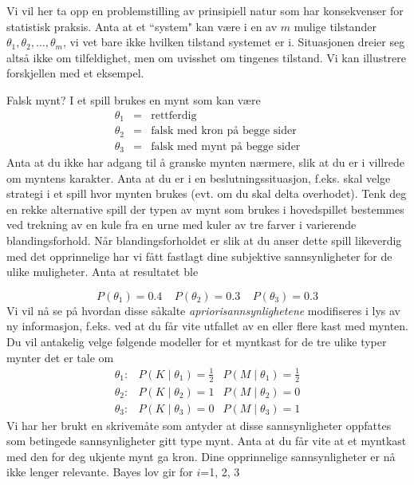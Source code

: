 {{Vi vil her ta opp en problemstilling av prinsipiell natur som har 
konsekvenser for statistisk praksis.  Anta at et ``system" kan være
i en av $m$ mulige tilstander ${\theta}_1, {\theta}_2, \ldots, {\theta}_m$,
vi vet bare ikke hvilken tilstand systemet er i.  Situasjonen dreier
seg altså ikke om tilfeldighet, men om uvisshet om tingenes tilstand.
Vi kan illustrere forskjellen med et eksempel.\\

\begin{eksempel}{Falsk mynt?}
I et spill brukes en mynt som kan være
\begin{eqnarray*}
  {\theta}_1 &=&\mbox{rettferdig} \\
  {\theta}_2 &=&\mbox{falsk med kron på begge sider} \\
  {\theta}_3 &=&\mbox{falsk med mynt på begge sider}
\end{eqnarray*}
Anta at du ikke har adgang til å granske mynten nærmere, slik
at du er i villrede om myntens karakter.  Anta at du er i en 
beslutningssituasjon, f.eks. skal velge strategi i et spill hvor
mynten brukes (evt. om du skal delta overhodet).  Tenk deg en rekke
alternative spill der typen av mynt som brukes i hovedspillet bestemmes
ved trekning av en kule fra en urne med kuler av tre farver i 
varierende blandingsforhold.  Når blandingsforholdet er slik at 
du anser dette spill likeverdig med det opprinnelige har vi fått
fastlagt dine subjektive sannsynligheter for de ulike muligheter.  Anta
at resultatet ble

\[ P({\theta}_1)=0.4 \;\;\;\; P({\theta}_2)=0.3 \;\;\;\; P({\theta}_3)=0.3  \]
Vi vil nå se på hvordan disse såkalte 
{\em apriorisannsynlighetene} modifiseres i lys av ny informasjon, f.eks.
ved at du får vite utfallet av en eller flere kast med mynten.  Du
vil antakelig velge følgende modeller for et myntkast for de tre
ulike typer mynter det er tale om 
$$
\begin{array}{rcc}
  {\theta}_1: & P(K\mid {\theta}_1)=\frac{1}{2} &
                         P(M\mid {\theta}_1)=\frac{1}{2} \\
 {\theta}_2: & P(K\mid {\theta}_2)=1            & P(M\mid {\theta}_2)=0  \\
  {\theta}_3: & P(K\mid {\theta}_3)=0           & P(M\mid {\theta}_3)=1  
\end{array}
$$
Vi har her brukt en skrivemåte som antyder at disse sannsynligheter
oppfattes som betingede sannsynligheter gitt type mynt.  Anta at du
får vite at et myntkast med den for deg ukjente mynt ga kron.  Dine
opprinnelige sannsynligheter er nå ikke lenger relevante.  Bayes
lov gir for $i$=1, 2, 3


\end{eksempel}}}
